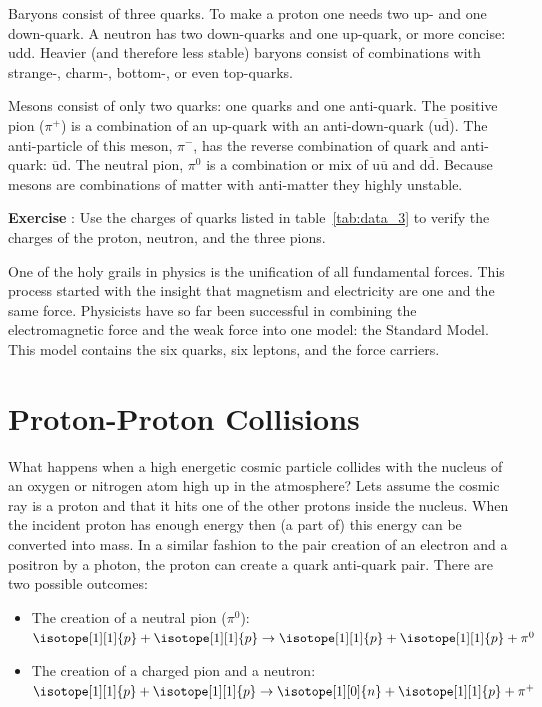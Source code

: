 \documentclass[12pt,a4paper]{article}
\numberwithin{equation}{section}
\numberwithin{figure}{section}
\newcounter{Exercise}
\numberwithin{table}{section}
\begin{document}
Baryons consist of three quarks. To make a proton one needs two up- and one down-quark. A neutron has two down-quarks and one up-quark, or more concise: udd. Heavier (and therefore less stable) baryons consist of combinations with strange-, charm-, bottom-, or even top-quarks.

Mesons consist of only two quarks: one quarks and one anti-quark. The positive pion ($\pi^+$) is a combination of an up-quark with an anti-down-quark (u$\overline{\mbox{d}}$). The anti-particle of this meson, $\pi^-$, has the reverse combination of quark and anti-quark: $\overline{\mbox{u}}$d. The neutral pion, $\pi^0$ is a combination or mix of u$\overline{\mbox{u}}$ and d$\overline{\mbox{d}}$. Because mesons are combinations of matter with anti-matter they highly unstable. 

\begin{shaded}
\textbf{Exercise \theExercise {}} : Use the charges of quarks listed in table~\ref{tab:data_3} to verify the charges of the proton, neutron, and the three pions.\end{shaded}

One of the holy grails in physics is the unification of all fundamental forces. This process started with the insight that magnetism and electricity are one and the same force. Physicists have so far been successful in combining the electromagnetic force and the weak force into one model: the Standard Model. This model contains the six quarks, six leptons, and the force carriers.

\section{Proton-Proton Collisions}
What happens when a high energetic cosmic particle collides with the nucleus of an oxygen or nitrogen atom high up in the atmosphere? Lets assume the cosmic ray is a proton and that it hits one of the other protons inside the nucleus. When the incident proton has enough energy then (a part of) this energy can be converted into mass. In a similar fashion to the pair creation of an electron and a positron by a photon, the proton can create a quark anti-quark pair. There are two possible outcomes:
\begin{itemize}
\item The creation of a neutral pion ($\pi^ 0$): $\isotope[1][1]{p} + \isotope[1][1]{p} \rightarrow \isotope[1][1]{p} + \isotope[1][1]{p} + \pi^0$
\item The creation of a charged pion and a neutron: $\isotope[1][1]{p} + \isotope[1][1]{p} \rightarrow \isotope[1][0]{n} + \isotope[1][1]{p} + \pi^+$
\end{itemize}
\end{document}
